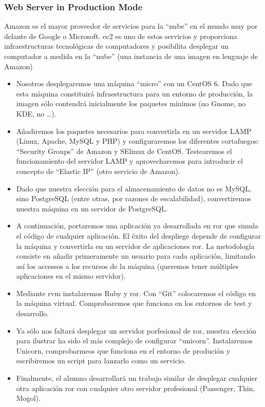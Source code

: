 \documentclass{beamer}
\begin{document}
\begin{frame}
\frametitle{Web Server in Production Mode}
Amazon es el mayor proveedor de servicios para la ``nube'' en el mundo muy por delante de Google o Microsoft.
\acrfull{ec2} es uno de estos servicios y proporciona infraestructuras tecnológicas de computadores y posibilita
desplegar un computador a medida en la ``nube'' (una instancia de una imagen en lenguaje de Amazon)

\begin{itemize}
\item Nosotros desplegaremos una máquina ``micro'' con un CentOS 6.
Dado que esta máquina constituirá infraestructura para un entorno de producción, la imagen sólo contendrá inicialmente los paquetes mínimos (no Gnome, no KDE, no \dots).

\item Añadiremos los paquetes necesarios para convertirla en un servidor LAMP (Linux, Apache, MySQL y PHP) y configuraremos los diferentes cortafuegos: ``Security Groups'' de Amazon y SElinux de CentOS.
Testearemos el funcionamiento del servidor LAMP y aprovecharemos para introducir el concepto de ``Elastic IP'' (otro servicio de Amazon).

\item Dado que nuestra elección para el almacenamiento de datos no es MySQL, sino PostgreSQL (entre otras, por  razones de escalabilidad), convertiremos nuestra máquina en un servidor de PostgreSQL.

\item A continuación, portaremos una aplicación ya desarrollada en \acrfull{ror} que simula el código de cualquier aplicación. El éxito del despliege depende de configurar la máquina y convertirla en un servidor de aplicaciones \acrshort{ror}.
La metodología consiste en añadir primeramente un usuario para cada aplicación, limitando así los accessos a los recursos de la máquina (queremos tener múltiples aplicaciones en el mismo servidor).

\item Mediante \acrfull{rvm} instalaremos Ruby y \acrshort{ror}. Con ``Git''  colocaremos el código en la máquina virtual. Comprobaremos que funciona en los entornos de test y desarrollo.

\item Ya sólo nos faltará desplegar  un servidor porfesional de \acrshort{ror}, nuestra elección para ilustrar ha sido el más complejo de configurar ``unicorn''. Instalaremos Unicorn, comprobarmeos que funciona en el entorno de produción y escribiremos un script para lanzarlo como un servicio.

\item Finalmente, el alumno desarrollará un trabajo similar de desplegar cualquier otra aplicación \acrshort{ror} con cualquier otro servidor profesional (Passenger, Thin, Mogol).

\end{itemize}
\end{frame}
\end{document}
